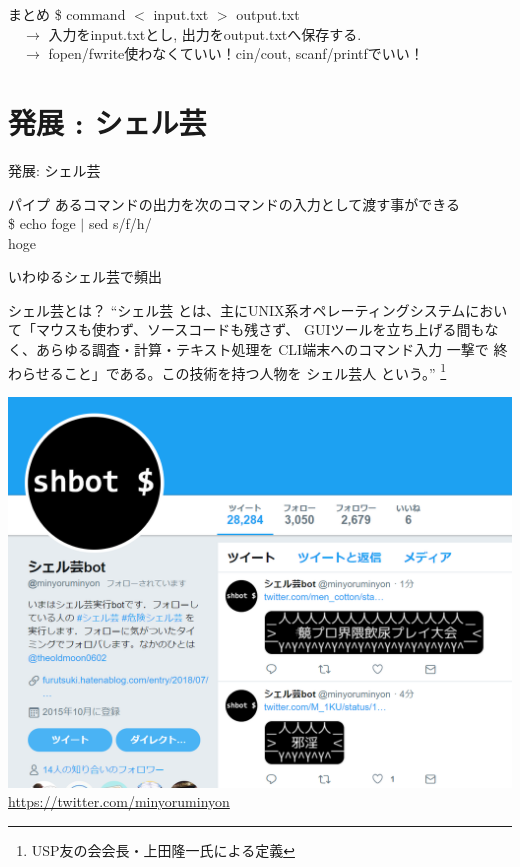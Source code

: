 \documentclass[uplatex, dvipdfmx, unicode]{beamer}
\begin{document}
\begin{frame}{まとめ}
  \$ command $<$ input.txt $>$ output.txt \\
  \ \ $\rightarrow$ 入力をinput.txtとし, 出力をoutput.txtへ保存する. \\
  \ \ $\rightarrow$ fopen/fwrite使わなくていい！cin/cout, scanf/printfでいい！
\end{frame}

\section{発展 : シェル芸}
\begin{frame}
  \centering
  \Huge{発展: シェル芸}
\end{frame}

\begin{frame}{パイプ}
  あるコマンドの出力を次のコマンドの入力として渡す事ができる \\
  \vspace{.2in}
  \$ echo foge $|$ sed s/f/h/ \\
  hoge

  \small いわゆるシェル芸で頻出
\end{frame}

\begin{frame}{シェル芸とは？}
  ``シェル芸 とは、主にUNIX系オペレーティングシステムにおいて「マウスも使わず、ソースコードも残さず、
  GUIツールを立ち上げる間もなく、あらゆる調査・計算・テキスト処理を CLI端末へのコマンド入力 一撃で
  終わらせること」である。この技術を持つ人物を シェル芸人 という。''
  \footnote{USP友の会会長・上田隆一氏による定義}
\end{frame}

\begin{frame}
  \centering
  \includegraphics[keepaspectratio, scale=.5]{./img/shellgei.png}\\
  \url{https://twitter.com/minyoruminyon}
\end{frame}
\end{document}
